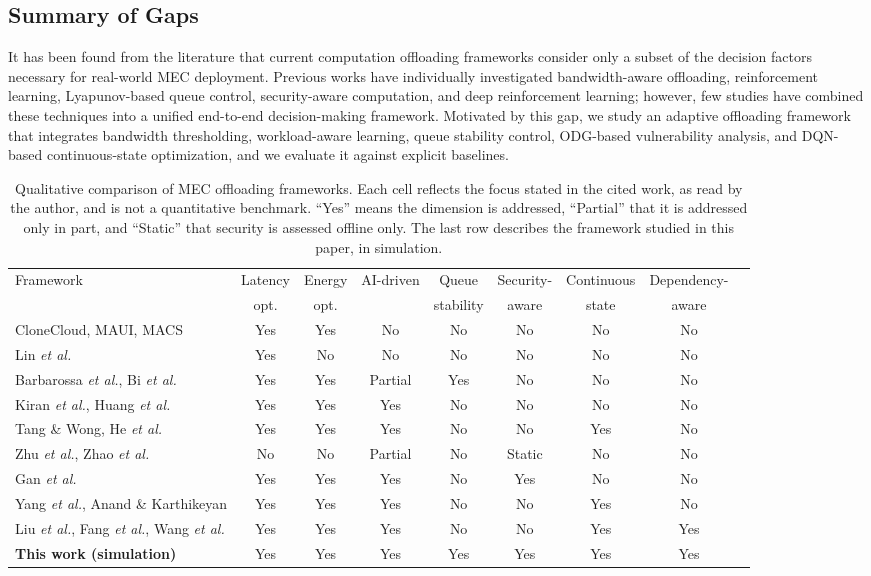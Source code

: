 \documentclass{ieeeaccess}
\begin{document}
\subsection{Summary of Gaps}
It has been found from the literature that current computation offloading frameworks consider only a subset of the decision factors necessary for real-world MEC deployment. Previous works have individually investigated bandwidth-aware offloading, reinforcement learning, Lyapunov-based queue control, security-aware computation, and deep reinforcement learning; however, few studies have combined these techniques into a unified end-to-end decision-making framework. Motivated by this gap, we study an adaptive offloading framework that integrates bandwidth thresholding, workload-aware learning, queue stability control, ODG-based vulnerability analysis, and DQN-based continuous-state optimization, and we evaluate it against explicit baselines.

\begin{table}[t]
\caption{Qualitative comparison of MEC offloading frameworks. Each cell reflects the focus stated in the cited work, as read by the author, and is not a quantitative benchmark. ``Yes'' means the dimension is addressed, ``Partial'' that it is addressed only in part, and ``Static'' that security is assessed offline only. The last row describes the framework studied in this paper, in simulation.}
\label{tab:compare}
\centering
\footnotesize
\begin{tabular}{@{}p{5.3cm}cccccccc@{}}
\toprule
Framework & Latency & Energy & AI-driven & Queue & Security- & Continuous & Dependency- \\
 & opt. & opt. & & stability & aware & state & aware \\
\midrule
CloneCloud, MAUI, MACS \cite{kovachev2012,cuervo2010,chun2011} & Yes & Yes & No & No & No & No & No \\
Lin \emph{et al.} \cite{lin2019} & Yes & No & No & No & No & No & No \\
Barbarossa \emph{et al.}, Bi \emph{et al.} \cite{barbarossa2013,bi2021} & Yes & Yes & Partial & Yes & No & No & No \\
Kiran \emph{et al.}, Huang \emph{et al.} \cite{kiran2020,huang2019} & Yes & Yes & Yes & No & No & No & No \\
Tang \& Wong, He \emph{et al.} \cite{tang2022,he2024} & Yes & Yes & Yes & No & No & Yes & No \\
Zhu \emph{et al.}, Zhao \emph{et al.} \cite{zhu2013,zhao2022} & No & No & Partial & No & Static & No & No \\
Gan \emph{et al.} \cite{gan2023} & Yes & Yes & Yes & No & Yes & No & No \\
Yang \emph{et al.}, Anand \& Karthikeyan \cite{yang2022,anand2026} & Yes & Yes & Yes & No & No & Yes & No \\
Liu \emph{et al.}, Fang \emph{et al.}, Wang \emph{et al.} \cite{liu2024dep,fang2024,wang2022dep} & Yes & Yes & Yes & No & No & Yes & Yes \\
\textbf{This work (simulation)} & Yes & Yes & Yes & Yes & Yes & Yes & Yes \\
\bottomrule
\end{tabular}
\end{table}
\end{document}
